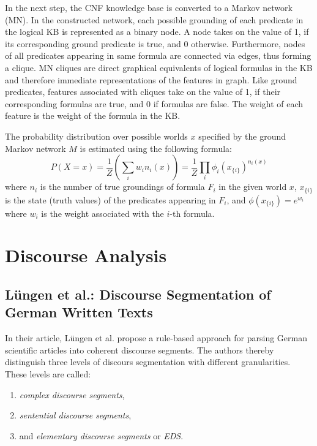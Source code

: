 \documentclass[a4paper,11pt]{article}
\begin{document}
In the next step, the CNF knowledge base is converted to a Markov network
(MN).  In the constructed network, each possible grounding of each predicate
in the logical KB is represented as a binary node.  A node takes on the value
of 1, if its corresponding ground predicate is true, and 0 otherwise.
Furthermore, nodes of all predicates appearing in same formula are connected
via edges, thus forming a clique.  MN cliques are direct graphical equivalents
of logical formulas in the KB and therefore immediate representations of the
features in graph.  Like ground predicates, features associated with cliques
take on the value of 1, if their corresponding formulas are true, and 0 if
formulas are false.  The weight of each feature is the weight of the formula
in the KB.

The probability distribution over possible worlds $x$ specified by the ground
Markov network $M$ is estimated using the following formula:
\begin{equation}
  P(X=x) = \frac{1}{Z}\left(\sum_i{w_in_i(x)}\right) = %
    \frac{1}{Z}\prod_i{\phi_i(x_{\{i\}})^{n_i(x)}}
\end{equation}
where $n_i$ is the number of true groundings of formula $F_i$ in the given
world $x$, $x_{\{i\}}$ is the state (truth values) of the predicates appearing
in $F_i$, and $\phi(x_{\{i\}}) = e^{w_i}$ where $w_i$ is the weight associated
with the $i$-th formula.

\section{Discourse Analysis}

\subsection{L\"ungen et al.: Discourse Segmentation of German Written Texts\cite{Luengen-06}}

In their article, L\"ungen et al. \cite{Luengen-06} propose a rule-based
approach for parsing German scientific articles into coherent discourse
segments.  The authors thereby distinguish three levels of discours
segmentation with different granularities.  These levels are called:
\begin{enumerate}
  \item \textit{complex discourse segments},\label{enum-cds}
  \item \textit{sentential discourse segments},\label{enum-sds}
  \item and \textit{elementary discourse segments} or \textit{EDS}.\label{enum-eds}
\end{enumerate}
\end{document}
